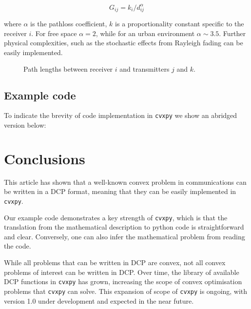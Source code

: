 \documentclass[twocolumn,secnumarabic,amssymb, nobibnotes, aps, prl,superscriptaddress]{revtex4-1}
\begin{document}
\begin{equation}
G_{ij} = k_i/d_{ij}^\alpha
\end{equation}

where $\alpha$ is the pathloss coefficient, $k$ is a proportionality constant specific to the receiver $i$.  For free space $\alpha = 2$, while for an urban environment $\alpha \sim 3.5$.  Further physical complexities, such as the stochastic effects from Rayleigh fading can be easily implemented.

\begin{figure}[H]
\centering
{}
\caption{Path lengths between receiver $i$ and transmitters $j$ and $k$.}\label{fig:spatial_diagram}
\end{figure}

\subsection{Example code}
To indicate the brevity of code implementation in \texttt{cvxpy} we show an abridged version below: 

\section{Conclusions}
This article has shown that a well-known convex problem in communications can be written in a DCP format, meaning that they can be easily implemented in \texttt{cvxpy}.

Our example code demonstrates a key strength of \texttt{cvxpy}, which is that the translation from the mathematical description to python code is straightforward and clear.  Conversely, one can also infer the mathematical problem from reading the code.

While all problems that can be written in DCP are convex, not all convex problems of interest can be written in DCP.  Over time, the library of available DCP functions in \texttt{cvxpy} has grown, increasing the scope of convex optimisation problems that \texttt{cvxpy} can solve.  This expansion of scope of \texttt{cvxpy} is ongoing, with version 1.0 under development and expected in the near future.
\end{document}

